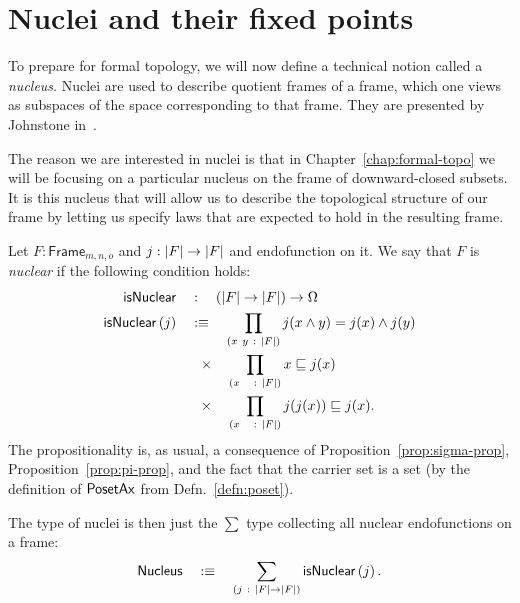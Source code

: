 \section{Nuclei and their fixed points}\label{sec:nuclei}

To prepare for formal topology, we will now define a technical notion called a
\emph{nucleus}. Nuclei are used to describe quotient frames of a frame, which one views as
subspaces of the space corresponding to that frame. They are presented by Johnstone
in~\cite[Sec.~II.2]{stone-spaces}.

The reason we are interested in nuclei is that in Chapter~\ref{chap:formal-topo} we will
be focusing on a particular nucleus on the frame of downward-closed subsets. It is this
nucleus that will allow us to describe the topological structure of our frame by letting
us specify laws that are expected to hold in the resulting frame.
\begin{defn}[Nucleus]\label{defn:nucleus}
  Let $F : \mathsf{Frame}_{m, n, o}$ and $j : \left| F \right| \rightarrow \left| F \right|$ and endofunction on it.
  We say that $F$ is \emph{nuclear} if the following condition holds:
  \begin{align*}
    \mathsf{isNuclear}{}\quad&:\quad (\left| F \right| \rightarrow \left| F \right|) \rightarrow \Omega                   \\
    \mathsf{isNuclear}{}\left(j\right) \quad&:\equiv\quad
       \prod_{(x~y~:~\left| F \right|)} j(x \wedge y) = j(x) \wedge j(y)  \\
      &\hspace{0.55em}\times\quad \prod_{(x~~~:~\left| F \right|)} x \sqsubseteq j(x)          \\
      &\hspace{0.55em}\times\quad \prod_{(x~~~:~\left| F \right|)} j(j(x)) \sqsubseteq j(x).
  \end{align*}
  The propositionality is, as usual, a consequence of Proposition~\ref{prop:sigma-prop},
  Proposition~\ref{prop:pi-prop}, and the fact that the carrier set is a set (by the
  definition of $\mathsf{PosetAx}{}$ from Defn.~\ref{defn:poset}).

  The type of nuclei is then just the $\sum$ type collecting all nuclear endofunctions on a
  frame:
  \begin{equation*}
    \mathsf{Nucleus} \quad:\equiv\quad \sum_{(j~:~\left| F \right| \rightarrow \left| F \right|)} \mathsf{isNuclear}{}\left(j\right).
  \end{equation*}
\end{defn}

